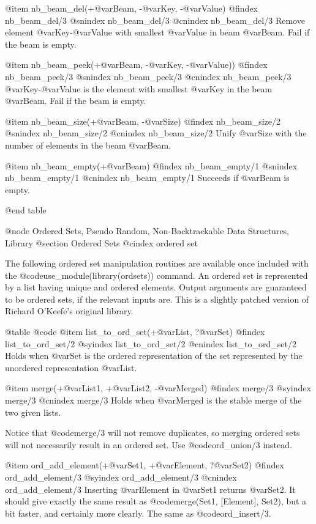 {{{{{{{{@item nb_beam_del(+@var{Beam}, -@var{Key}, -@var{Value})
@findex nb_beam_del/3
@snindex nb_beam_del/3
@cnindex nb_beam_del/3
Remove element @var{Key}-@var{Value} with smallest @var{Value} in beam
@var{Beam}. Fail if the beam is empty.

@item nb_beam_peek(+@var{Beam}, -@var{Key}, -@var{Value}))
@findex nb_beam_peek/3
@snindex nb_beam_peek/3
@cnindex nb_beam_peek/3
@var{Key}-@var{Value} is the element with smallest @var{Key} in the beam
@var{Beam}. Fail if the beam is empty.

@item nb_beam_size(+@var{Beam}, -@var{Size})
@findex nb_beam_size/2
@snindex nb_beam_size/2
@cnindex nb_beam_size/2
Unify @var{Size} with the number of elements in the beam  @var{Beam}.

@item nb_beam_empty(+@var{Beam})
@findex nb_beam_empty/1
@snindex nb_beam_empty/1
@cnindex nb_beam_empty/1
Succeeds if  @var{Beam} is empty.

@end table


@node Ordered Sets, Pseudo Random, Non-Backtrackable Data Structures, Library
@section Ordered Sets
@cindex ordered set

The following ordered set manipulation routines are available once
included with the @code{use_module(library(ordsets))} command.  An
ordered set is represented by a list having unique and ordered
elements. Output arguments are guaranteed to be ordered sets, if the
relevant inputs are. This is a slightly patched version of Richard
O'Keefe's original library.

@table @code
@item list_to_ord_set(+@var{List}, ?@var{Set})
@findex list_to_ord_set/2
@syindex list_to_ord_set/2
@cnindex list_to_ord_set/2
Holds when @var{Set} is the ordered representation of the set
represented by the unordered representation @var{List}.

@item merge(+@var{List1}, +@var{List2}, -@var{Merged})
@findex merge/3
@syindex merge/3
@cnindex merge/3
Holds when @var{Merged} is the stable merge of the two given lists.

Notice that @code{merge/3} will not remove duplicates, so merging
ordered sets will not necessarily result in an ordered set. Use
@code{ord_union/3} instead.

@item ord_add_element(+@var{Set1}, +@var{Element}, ?@var{Set2})
@findex ord_add_element/3
@syindex ord_add_element/3
@cnindex ord_add_element/3
Inserting @var{Element} in @var{Set1} returns @var{Set2}.  It should give
exactly the same result as @code{merge(Set1, [Element], Set2)}, but a
bit faster, and certainly more clearly. The same as @code{ord_insert/3}.

}}}}}}}}
